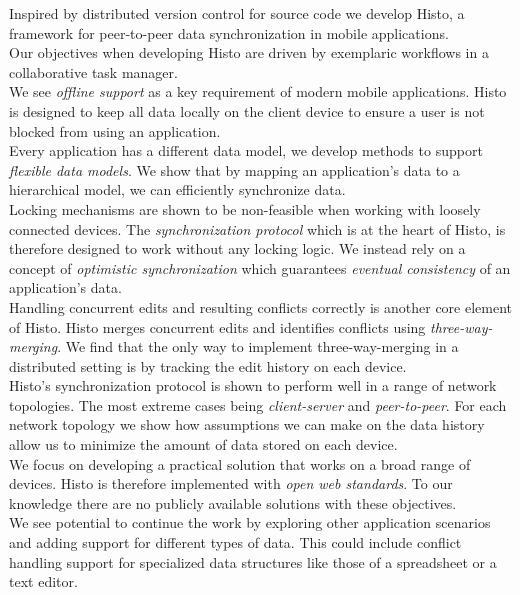 

Inspired by distributed version control for source code we develop Histo, a framework for peer-to-peer data synchronization in mobile applications.\\
Our objectives when developing Histo are driven by exemplaric workflows in a collaborative task manager.\\
We see \emph{offline support} as a key requirement of modern mobile applications.
Histo is designed to keep all data locally on the client device to ensure a user is not blocked from using an application.\\
Every application has a different data model, we develop methods to support \emph{flexible data models}.
We show that by mapping an application's data to a hierarchical model, we can efficiently synchronize data.\\
Locking mechanisms are shown to be non-feasible when working with loosely connected devices.
The \emph{synchronization protocol} which is at the heart of Histo, is therefore designed to work without any locking logic.
We instead rely on a concept of \emph{optimistic synchronization} which guarantees \emph{eventual consistency} of an application's data.\\
Handling concurrent edits and resulting conflicts correctly is another core element of Histo.
Histo merges concurrent edits and identifies conflicts using \emph{three-way-merging}.
We find that the only way to implement three-way-merging in a distributed setting is by tracking the edit history on each device.\\
Histo's synchronization protocol is shown to perform well in a range of network topologies.
The most extreme cases being \emph{client-server} and \emph{peer-to-peer}.
For each network topology we show how assumptions we can make on the data history allow us to minimize the amount of data stored on each device.\\
We focus on developing a practical solution that works on a broad range of devices.
Histo is therefore implemented with \emph{open web standards}.
To our knowledge there are no publicly available solutions with these objectives.\\
We see potential to continue the work by exploring other application scenarios and adding support for different types of data.
This could include conflict handling support for specialized data structures like those of a spreadsheet or a text editor.
